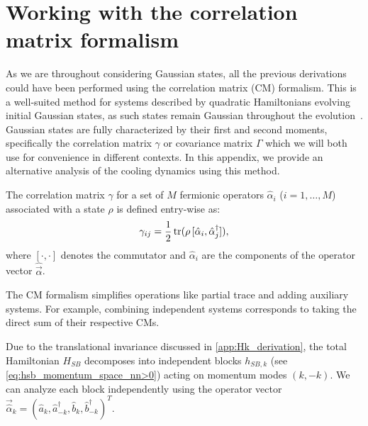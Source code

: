 \section{Working with the correlation matrix formalism}
\label{app:CM_derivation}

As we are throughout considering Gaussian states, all the previous derivations could have been performed using the correlation matrix (CM) formalism.
This is a well-suited method for systems described by quadratic Hamiltonians evolving initial Gaussian states, as such states remain Gaussian throughout the evolution~\cite{Weedbrook2012Gaussian}.
Gaussian states are fully characterized by their first and second moments, specifically the correlation matrix $\gamma$ or covariance matrix $\Gamma$ which we will both use for convenience in different contexts. In this appendix, we provide an alternative analysis of the cooling dynamics using this method.

The correlation matrix $\gamma$ for a set of $M$ fermionic operators $\hat{\alpha}_i$ ($i=1, \dots, M$) associated with a state $\rho$ is defined entry-wise as:
\begin{equation}
    \gamma_{ij} = \frac{1}{2}\operatorname{tr}(\rho\,[\hat{\alpha}_i,\hat{\alpha}_j^\dagger]),
    \label{eq:CM_definition}
\end{equation}
where $[\cdot,\cdot]$ denotes the commutator and $\hat{\alpha}_i$ are the components of the operator vector $\hat{\vec{\alpha}}$.


The CM formalism simplifies operations like partial trace and adding auxiliary systems. For example, combining independent systems corresponds to taking the direct sum of their respective CMs.


Due to the translational invariance discussed in \cref{app:Hk_derivation}, the total Hamiltonian $H_{SB}$ decomposes into independent blocks $h_{SB,k}$ (see \cref{eq:hsb_momentum_space_nn>0}) acting on momentum modes $(k, -k)$. We can analyze each block independently using the operator vector $\vec{\hat{\alpha}}_k = (\hat{a}_{k}, \hat{a}_{-k}^\dagger, \hat{b}_{k}, \hat{b}_{-k}^\dagger)^T$.

